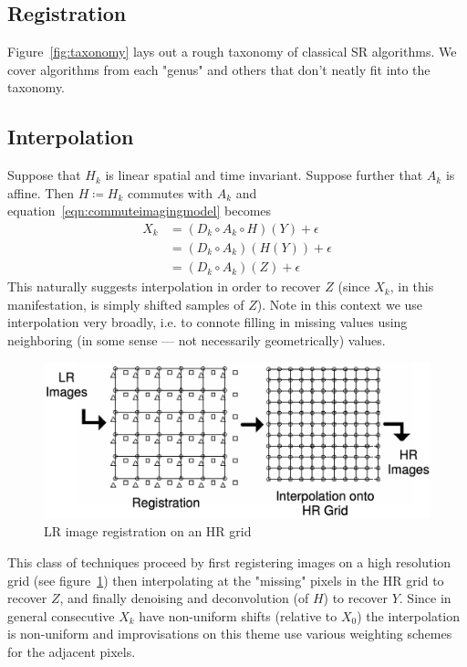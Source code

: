\subsection{Registration}

Figure~\ref{fig:taxonomy} lays out a rough taxonomy of classical SR algorithms.
%
We cover algorithms from each "genus" and others that don't neatly fit into the taxonomy.
\subsection{Interpolation}
Suppose that $H_k$ is linear spatial and time invariant.
%
Suppose further that $A_k$ is affine.
%
Then $H \coloneqq H_k$ commutes with $A_k$\cite{meladcommute} and equation~\ref{eqn:commuteimagingmodel} becomes
\begin{align}
    X_k &= (D_k \circ A_k \circ H) (Y) + \epsilon \\
    &= (D_k \circ A_k) (H(Y)) + \epsilon \\
    &= (D_k \circ A_k) (Z) + \epsilon
    \label{eqn:commuteimagingmodel}
\end{align}
This naturally suggests interpolation in order to recover $Z$ (since $X_k$, in this manifestation, is simply shifted samples of $Z$).
%
Note in this context we use interpolation very broadly, i.e. to connote filling in missing values using neighboring (in some sense --- not necessarily geometrically) values.
%
\begin{figure}
    \centering
    \includegraphics[width=\linewidth]{figures/hrgrid.png}
    \caption{LR image registration on an HR grid\cite{Lin}}
    \label{fig:hrgrid}
\end{figure}
This class of techniques proceed by first registering images on a high resolution grid (see figure~\ref{fig:hrgrid}) then interpolating at the "missing" pixels in the HR grid to recover $Z$, and finally denoising and deconvolution (of $H$) to recover $Y$.
%
Since in general consecutive $X_k$ have non-uniform shifts (relative to $X_0$) the interpolation is non-uniform and improvisations on this theme use various weighting schemes for the adjacent pixels.

